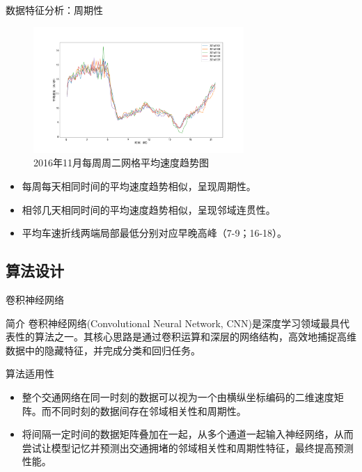 \documentclass[10pt]{beamer}
\begin{document}
\begin{frame}{数据特征分析：周期性}
    \begin{figure}
        \centering
        \includegraphics[width=8cm]{pic/五个周二平均速度线型图.png}
        \caption{2016年11月每周周二网格平均速度趋势图}
        \label{fig.period}
    \end{figure}
    \begin{itemize}
        \item 每周每天相同时间的平均速度趋势相似，呈现\alert{周期性}。
        \item 相邻几天相同时间的平均速度趋势相似，呈现\alert{邻域连贯性}。
        \item 平均车速折线两端\alert{局部最低}分别对应\alert{早晚高峰}（7-9；16-18）。
\end{itemize}
\end{frame}

\subsection{算法设计}

\begin{frame}{卷积神经网络}

    \begin{block}{简介}
       卷积神经网络(Convolutional Neural Network, CNN)是深度学习领域最具代表性的算法之一。其核心思路是通过卷积运算和深层的网络结构，高效地捕捉高维数据中的\alert{隐藏特征}，并完成分类和\alert{回归}任务。
    \end{block}
    
    \begin{block}{算法适用性}
        \begin{itemize}
            \item 整个交通网络在同一时刻的数据可以视为一个由横纵坐标编码的\alert{二维速度矩阵}。而不同时刻的数据间存在\alert{邻域相关性}和\alert{周期性}。
            \item 将间隔一定时间的数据矩阵叠加在一起，从多个通道一起输入神经网络，从而尝试让模型记忆并预测出交通拥堵的邻域相关性和周期性特征，最终提高预测性能。
        \end{itemize}
    \end{block}
    
\end{frame}
\end{document}
